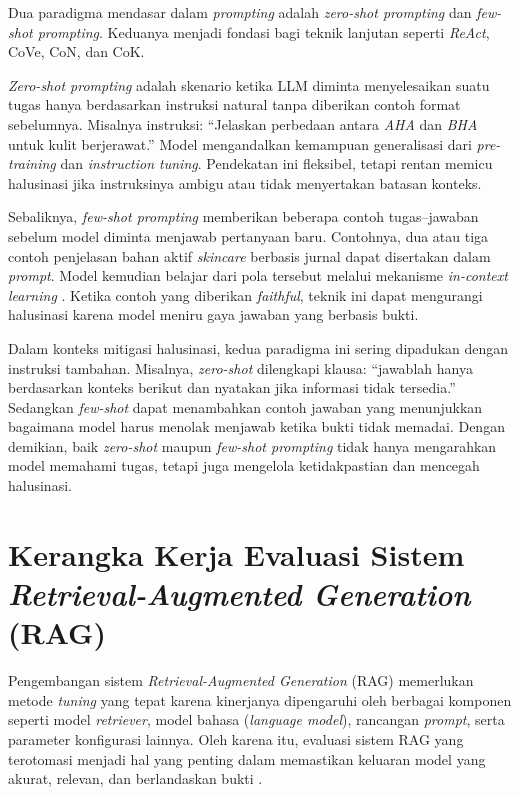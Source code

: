 Dua paradigma mendasar dalam \textit{prompting} adalah \textit{zero-shot prompting} dan \textit{few-shot prompting}. Keduanya menjadi fondasi bagi teknik lanjutan seperti \textit{ReAct}, CoVe, CoN, dan CoK.

\textit{Zero-shot prompting} adalah skenario ketika LLM diminta menyelesaikan suatu tugas hanya berdasarkan instruksi natural tanpa diberikan contoh format sebelumnya. Misalnya instruksi: ``Jelaskan perbedaan antara \textit{AHA} dan \textit{BHA} untuk kulit berjerawat.'' Model mengandalkan kemampuan generalisasi dari \textit{pre-training} dan \textit{instruction tuning}. Pendekatan ini fleksibel, tetapi rentan memicu halusinasi jika instruksinya ambigu atau tidak menyertakan batasan konteks.

Sebaliknya, \textit{few-shot prompting} memberikan beberapa contoh tugas--jawaban sebelum model diminta menjawab pertanyaan baru. Contohnya, dua atau tiga contoh penjelasan bahan aktif \textit{skincare} berbasis jurnal dapat disertakan dalam \textit{prompt}. Model kemudian belajar dari pola tersebut melalui mekanisme \textit{in-context learning} \parencite{zhao2023survey}. Ketika contoh yang diberikan \textit{faithful}, teknik ini dapat mengurangi halusinasi karena model meniru gaya jawaban yang berbasis bukti.

Dalam konteks mitigasi halusinasi, kedua paradigma ini sering dipadukan dengan instruksi tambahan. Misalnya, \textit{zero-shot} dilengkapi klausa: ``jawablah hanya berdasarkan konteks berikut dan nyatakan jika informasi tidak tersedia.'' Sedangkan \textit{few-shot} dapat menambahkan contoh jawaban yang menunjukkan bagaimana model harus menolak menjawab ketika bukti tidak memadai. Dengan demikian, baik \textit{zero-shot} maupun \textit{few-shot prompting} tidak hanya mengarahkan model memahami tugas, tetapi juga mengelola ketidakpastian dan mencegah halusinasi.


\section{Kerangka Kerja Evaluasi Sistem \textit{Retrieval-Augmented Generation} (RAG)}
\label{sec:kerangka-evaluasi-rag}

Pengembangan sistem \textit{Retrieval-Augmented Generation} (RAG) memerlukan metode \textit{tuning} yang tepat karena kinerjanya dipengaruhi oleh berbagai komponen seperti model \textit{retriever}, model bahasa (\textit{language model}), rancangan \textit{prompt}, serta parameter konfigurasi lainnya. Oleh karena itu, evaluasi sistem RAG yang terotomasi menjadi hal yang penting dalam memastikan keluaran model yang akurat, relevan, dan berlandaskan bukti \parencite{es2024ragas}.

